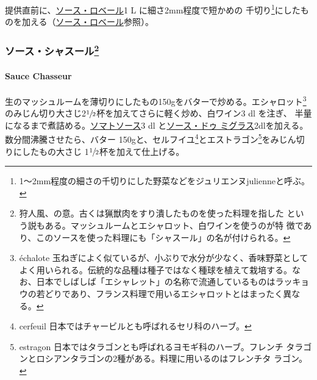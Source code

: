 \documentclass[twoside,12Q,b5j]{escoffierltjsbook}
\newenvironment{recette}{\begin{small}\begin{spacing}{1}\begin{multicols}{2}}{\end{multicols}\end{spacing}\end{small}}
\begin{document}
\begin{recette}

提供直前に、\protect\hyperlink{sauce-robert}{ソース・ロベール}1 L
に細さ2mm程度で短かめの 千切り\footnote{1〜2mm程度の細さの千切りにした野菜などをジュリエンヌjulienneと呼ぶ。}にしたものを加える（\protect\hyperlink{sauce-robert}{ソース・ロベール}参照）。

\vspace*{1.7\zw}

\subsubsection[ソース・シャスール]{\texorpdfstring{ソース・シャスール\footnote{狩人風、の意。古くは猟獣肉をすり潰したものを使った料理を指した
  という説もある。マッシュルームとエシャロット、白ワインを使うのが特
  徴であり、このソースを使った料理にも「シャスール」の名が付けられる。}}{ソース・シャスール}}\label{ux30bdux30fcux30b9ux30b7ux30e3ux30b9ux30fcux30eb10}

\paragraph{Sauce Chasseur}\label{sauce-chasseur}


生のマッシュルームを薄切りにしたもの150gをバターで炒める。エシャロット\footnote{échalote
  玉ねぎによく似ているが、小ぶりで水分が少なく、香味野菜としてよく用いられる。伝統的な品種は種子ではなく種球を植えて栽培する。なお、日本でしばしば「エシャレット」の名称で流通しているものはラッキョウの若どりであり、フランス料理で用いるエシャロットとはまったく異なる。}
のみじん切り大さじ2\(\sfrac{1}{2}\)杯を加えてさらに軽く炒め、白ワイン3
dl を注ぎ、
半量になるまで煮詰める。\protect\hyperlink{sauce-tomate}{ソマトソース}3
dl と\protect\hyperlink{sauce-demi-glace}{ソース・ドゥ
ミグラス}2dlを加える。数分間沸騰させたら、バター
150gと、セルフイユ\footnote{cerfeuil
  日本ではチャービルとも呼ばれるセリ科のハーブ。}とエストラゴン\footnote{estragon
  日本ではタラゴンとも呼ばれるヨモギ科のハーブ。フレンチ
  タラゴンとロシアンタラゴンの2種がある。料理に用いるのはフレンチタ
  ラゴン。}をみじん切りにしたもの大さじ
1\(\sfrac{1}{2}\)杯を加えて仕上げる。


\end{recette}
\end{document}
